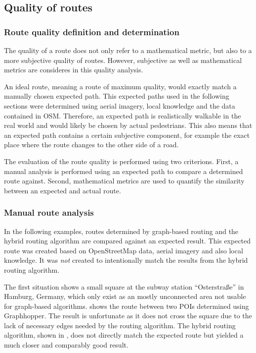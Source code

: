 	\subsection{Quality of routes}
	
		\subsubsection{Route quality definition and determination}
	
			The quality of a route does not only refer to a mathematical metric, but also to a more subjective quality of routes.
			However, subjective as well as mathematical metrics are consideres in this quality analysis.
			
			An ideal route, meaning a route of maximum quality, would exactly match a manually chosen expected path.
			This expected paths used in the following sections were determined using aerial imagery, local knowledge and the data contained in OSM.
			Therefore, an expected path is realistically walkable in the real world and would likely be chosen by actual pedestrians.
			This also means that an expected path contains a certain subjective component, for example the exact place where the route changes to the other side of a road.
	
			The evaluation of the route quality is performed using two criterions.
			First, a manual analysis is performed using an expected path to compare a determined route against.
			Second, mathematical metrics are used to quantify the similarity between an expected and actual route.
		
		\subsubsection{Manual route analysis}
		\label{subsubsec:manual-route-analysis}
		
			In the following examples, routes determined by graph-based routing and the hybrid routing algorithm are compared against an expected result.
			This expected route was created based on OpenStreetMap data, aerial imagery and also local knowledge.
			It was \emph{not} created to intentionally match the results from the hybrid routing algorithm.
		
			The first situation shows a small square at the subway station \enquote{Osterstraße} in Hamburg, Germany, which only exist as an mostly unconnected area not usable for graph-based algorithms.
			 shows the route between two POIs determined using Graphhopper.
			The result is unfortunate as it does not cross the square due to the lack of necessary edges needed by the routing algorithm.
			The hybrid routing algorithm, shown in , does not directly match the expected route but yielded a much closer and comparably good result.
			
